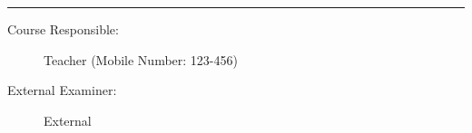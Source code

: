 \documentclass[
11pt,%
a4paper,%
]%
{article}%
\begin{document}
\vspace{10pt}\vfill\hrule
\begin{description}
\item[Course Responsible:] Teacher (Mobile Number: 123-456)
\item[External Examiner:] External
\end{description}




\end{document}
